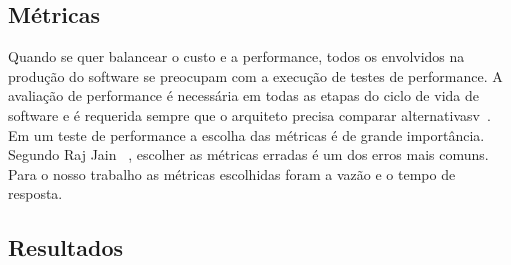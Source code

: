 \subsection{Métricas}

Quando se quer balancear o custo e a performance, todos os envolvidos na produção do software se preocupam com a execução de testes de performance. A avaliação de performance é necessária em todas as etapas do ciclo de vida de software e é requerida sempre que o arquiteto precisa comparar alternativasv~\cite{rajjain}. Em um teste de performance a escolha das métricas é de grande importância. Segundo Raj Jain ~\cite{rajjain}, escolher as métricas erradas é um dos erros mais comuns. Para o nosso trabalho as métricas escolhidas foram a vazão e o tempo de resposta.

\subsection{Resultados}



